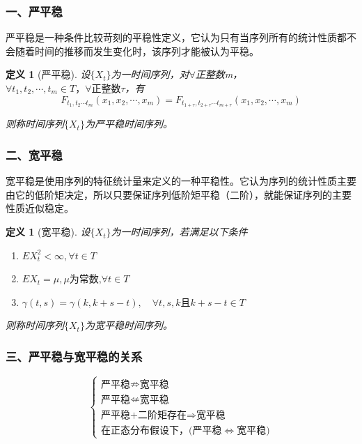 \documentclass[12pt, a4paper, oneside]{ctexbook}
\newtheorem{definition}[theorem]{定义}
\begin{document}
\subsubsection{一、严平稳}
严平稳是一种条件比较苛刻的平稳性定义，它认为只有当序列所有的统计性质都不会随着时间的推移而发生变化时，该序列才能被认为平稳。
\begin{definition}[严平稳]
    设$\{X_t\}$为一时间序列，对$\forall$正整数m，$\forall t_1,t_2,\cdots,t_m\in T\text{，}\forall\text{正整数}\tau$，有
    \begin{equation}
        F_{t_1,t_2\cdots t_m}\left(x_1,x_2,\cdots,x_m\right)=F_{t_{1+\tau},t_{2+\tau}\cdots t_{m+\tau}}\left(x_1,x_2,\cdots,x_m\right)
    \end{equation}
    \par 则称时间序列$\{X_t\}$为严平稳时间序列。
\end{definition}

\subsubsection{二、宽平稳}
宽平稳是使用序列的特征统计量来定义的一种平稳性。它认为序列的统计性质主要由它的低阶矩决定，所以只要保证序列低阶矩平稳（二阶），就能保证序列的主要性质近似稳定。

\begin{definition}[宽平稳]
    设$\{X_t\}$为一时间序列，若满足以下条件
    \begin{enumerate}[1.]
        \item $EX_t^2<\infty,\forall t\in T$
        \item $EX_t=\mu,\mu\text{为常数,}\forall t\in T$
        \item $\gamma(t,s)=\gamma(k,k+s-t),\quad\forall t,s,k\text{且}k+s-t\in T$
    \end{enumerate}
    \par 则称时间序列$\{X_t\}$为宽平稳时间序列。
\end{definition}

\subsubsection{三、严平稳与宽平稳的关系}
\begin{equation*}
    \left\{ \begin{array}{l}
        \text{严平稳} \nRightarrow  \text{宽平稳}       \\
        \text{严平稳} \nLeftarrow  \text{宽平稳}        \\
        \text{严平稳+二阶矩存在}  \Rightarrow  \text{宽平稳} \\
        \text{在正态分布假设下，(严平稳} \Leftrightarrow \text{宽平稳})
    \end{array} \right.
\end{equation*}
\end{document}
